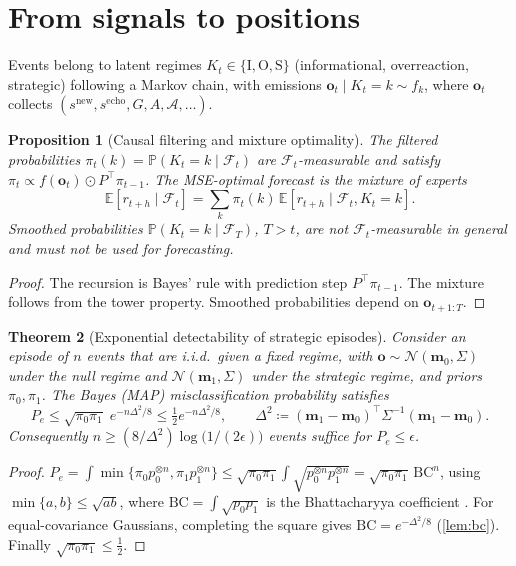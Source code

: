 \documentclass{article}
\theoremstyle{plain}
\newtheorem{theorem}{Theorem}
\newtheorem{proposition}[theorem]{Proposition}
\theoremstyle{definition}
\theoremstyle{remark}
\newcommand{\E}{\mathbb{E}}
\newcommand{\Prob}{\mathbb{P}}
\newcommand{\N}{\mathcal{N}}
\newcommand{\F}{\mathcal{F}}
\begin{document}
\section{From signals to positions}\label{app:inference}\label{sec:inference}\label{sec:sizing}
Events belong to latent regimes $K_t\in\{\mathrm{I},\mathrm{O},\mathrm{S}\}$ (informational, overreaction, strategic) following a Markov chain, with emissions $\bm o_t\mid K_t=k\sim f_k$, where $\bm o_t$ collects $(s^{\text{new}},s^{\text{echo}},G,A,\mathcal{A},\dots)$.

\begin{proposition}[Causal filtering and mixture optimality]\label{prop:filter}
The filtered probabilities $\pi_t(k)=\Prob(K_t=k\mid\F_t)$ are $\F_t$-measurable and satisfy $\pi_t\propto f(\bm o_t)\odot P^\top\pi_{t-1}$. The MSE-optimal forecast is the mixture of experts
\[
  \E[r_{t+h}\mid\F_t]=\sum_k\pi_t(k)\,\E[r_{t+h}\mid\F_t,K_t=k].
\]
Smoothed probabilities $\Prob(K_t=k\mid\F_T)$, $T>t$, are not $\F_t$-measurable in general and must not be used for forecasting.
\end{proposition}
\begin{proof}
The recursion is Bayes' rule with prediction step $P^\top\pi_{t-1}$. The mixture follows from the tower property. Smoothed probabilities depend on $\bm o_{t+1:T}$.
\end{proof}

\begin{theorem}[Exponential detectability of strategic episodes]\label{thm:detect}
Consider an episode of $n$ events that are i.i.d.\ given a fixed regime, with $\bm o\sim\N(\bm m_0,\Sigma)$ under the null regime and $\N(\bm m_1,\Sigma)$ under the strategic regime, and priors $\pi_0,\pi_1$. The Bayes (MAP) misclassification probability satisfies
\[
  P_e\le\sqrt{\pi_0\pi_1}\;e^{-n\Delta^2/8}\le\tfrac12e^{-n\Delta^2/8},\qquad \Delta^2\coloneqq(\bm m_1-\bm m_0)^\top\Sigma^{-1}(\bm m_1-\bm m_0).
\]
Consequently $n\ge(8/\Delta^2)\log\big(1/(2\epsilon)\big)$ events suffice for $P_e\le\epsilon$.
\end{theorem}
\begin{proof}
$P_e=\int\min\{\pi_0p_0^{\otimes n},\pi_1p_1^{\otimes n}\}\le\sqrt{\pi_0\pi_1}\int\sqrt{p_0^{\otimes n}p_1^{\otimes n}}=\sqrt{\pi_0\pi_1}\,\mathrm{BC}^n$, using $\min\{a,b\}\le\sqrt{ab}$, where $\mathrm{BC}=\int\sqrt{p_0p_1}$ is the Bhattacharyya coefficient \citep{bhattacharyya1943,kailath1967}. For equal-covariance Gaussians, completing the square gives $\mathrm{BC}=e^{-\Delta^2/8}$ (\cref{lem:bc}). Finally $\sqrt{\pi_0\pi_1}\le\tfrac12$.
\end{proof}
\end{document}
